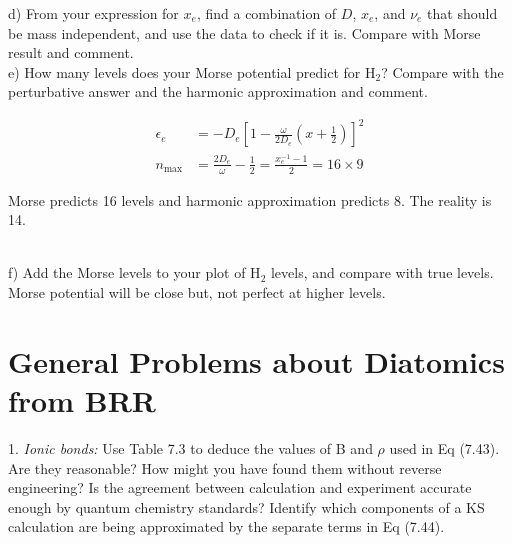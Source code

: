 \documentclass{article}
\begin{document}
\noindent d) From your expression for $x_e$, find a combination of $D$, $x_e$, and $\nu_e$
that should be mass independent, and use the data to check if it is.  Compare with
Morse result and comment.
\\

\pagebreak
\noindent e) How many levels does your Morse potential predict for H$_2$?  Compare with the
perturbative answer and the harmonic approximation and comment.

{\color{blue}
  \begin{align*}
    \epsilon_e & = -D_e[1-\frac{\omega}{2D_e}(x+\frac{1}{2})]^2 \\
    n_{\text{max}} & = \frac{2D_e}{\omega} - \frac{1}{2} = \frac{x_e^{-1}-1}{2} = 16\times9
  \end{align*}
  
  Morse predicts 16 levels and harmonic approximation predicts 8. The reality is 14.}
\\

\noindent f) Add the Morse levels to your plot of H$_2$ levels, and compare with true levels.
\\

{\color{blue} Morse potential will be close but, not perfect at higher levels.}

\pagebreak

\section*{General Problems about Diatomics from BRR}

  1. \textit{Ionic bonds:} Use Table 7.3 to deduce the values of B and $\rho$ used in
  Eq (7.43). Are they reasonable? How might you have found them without reverse engineering?
  Is the agreement between calculation and experiment accurate enough by quantum chemistry
  standards? Identify which components of a KS calculation are being approximated by the
  separate terms in Eq (7.44).
\end{document}
